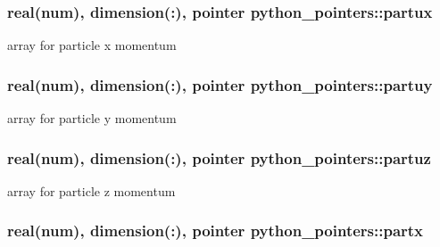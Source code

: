 \subsubsection[{\texorpdfstring{partux}{partux}}]{\setlength{\rightskip}{0pt plus 5cm}real(num), dimension(\+:), pointer python\+\_\+pointers\+::partux}\hypertarget{namespacepython__pointers_a733cff77ba19e5a06a73224fe9f53542}{}\label{namespacepython__pointers_a733cff77ba19e5a06a73224fe9f53542}


array for particle x momentum 

\subsubsection[{\texorpdfstring{partuy}{partuy}}]{\setlength{\rightskip}{0pt plus 5cm}real(num), dimension(\+:), pointer python\+\_\+pointers\+::partuy}\hypertarget{namespacepython__pointers_a60b173a25b047377d55cd66dfb5fad04}{}\label{namespacepython__pointers_a60b173a25b047377d55cd66dfb5fad04}


array for particle y momentum 

\subsubsection[{\texorpdfstring{partuz}{partuz}}]{\setlength{\rightskip}{0pt plus 5cm}real(num), dimension(\+:), pointer python\+\_\+pointers\+::partuz}\hypertarget{namespacepython__pointers_a98c8cf1649933f3239b068104d637d6c}{}\label{namespacepython__pointers_a98c8cf1649933f3239b068104d637d6c}


array for particle z momentum 

\subsubsection[{\texorpdfstring{partx}{partx}}]{\setlength{\rightskip}{0pt plus 5cm}real(num), dimension(\+:), pointer python\+\_\+pointers\+::partx}\hypertarget{namespacepython__pointers_a11c207d7f4fb2d96dad5a926172277df}{}\label{namespacepython__pointers_a11c207d7f4fb2d96dad5a926172277df}



